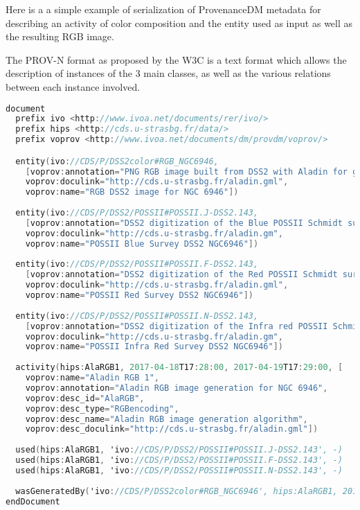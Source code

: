 
Here is a a simple example of serialization of ProvenanceDM metadata for describing an activity of color composition and the entity used as input as well as the resulting RGB image. 

The PROV-N format \cite{std:PROV-N} as proposed by the W3C is a text format which allows the description of instances of the 3 main classes, as well as the various relations between each instance involved.

\begin{lstlisting}[language=C, style=customc,caption= PROV-N serialisation example for a color composition activity]
document
  prefix ivo <http://www.ivoa.net/documents/rer/ivo/>
  prefix hips <http://cds.u-strasbg.fr/data/>
  prefix voprov <http://www.ivoa.net/documents/dm/provdm/voprov/>

  entity(ivo://CDS/P/DSS2color#RGB_NGC6946, 
	[voprov:annotation="PNG RGB image built from DSS2 with Aladin for galaxy NGC 6946", 
	voprov:doculink="http://cds.u-strasbg.fr/aladin.gml", 
	voprov:name="RGB DSS2 image for NGC 6946"])
	
  entity(ivo://CDS/P/DSS2/POSSII#POSSII.J-DSS2.143, 
	[voprov:annotation="DSS2 digitization of the Blue POSSII Schmidt survey around  NGC 6946",
	voprov:doculink="http://cds.u-strasbg.fr/aladin.gm", 
	voprov:name="POSSII Blue Survey DSS2 NGC6946"])
	
  entity(ivo://CDS/P/DSS2/POSSII#POSSII.F-DSS2.143, 
	[voprov:annotation="DSS2 digitization of the Red POSSII Schmidt survey around NGC 6946",
	voprov:doculink="http://cds.u-strasbg.fr/aladin.gml", 
	voprov:name="POSSII Red Survey DSS2 NGC6946"])
	
  entity(ivo://CDS/P/DSS2/POSSII#POSSII.N-DSS2.143, 
	[voprov:annotation="DSS2 digitization of the Infra red POSSII Schmidt survey around NGC 6946",
	voprov:doculink="http://cds.u-strasbg.fr/aladin.gm", 
	voprov:name="POSSII Infra Red Survey DSS2 NGC6946"])
	
  activity(hips:AlaRGB1, 2017-04-18T17:28:00, 2017-04-19T17:29:00, [
	voprov:name="Aladin RGB 1", 
	voprov:annotation="Aladin RGB image generation for NGC 6946",
	voprov:desc_id="AlaRGB",
	voprov:desc_type="RGBencoding", 
	voprov:desc_name="Aladin RGB image generation algorithm", 	
	voprov:desc_doculink="http://cds.u-strasbg.fr/aladin.gml"])
	
  used(hips:AlaRGB1, 'ivo://CDS/P/DSS2/POSSII#POSSII.J-DSS2.143', -)
  used(hips:AlaRGB1, 'ivo://CDS/P/DSS2/POSSII#POSSII.F-DSS2.143', -)
  used(hips:AlaRGB1, 'ivo://CDS/P/DSS2/POSSII#POSSII.N-DSS2.143', -)
	
  wasGeneratedBy('ivo://CDS/P/DSS2color#RGB_NGC6946', hips:AlaRGB1, 2017-05-05T00:00:00)
endDocument
\end{lstlisting}

